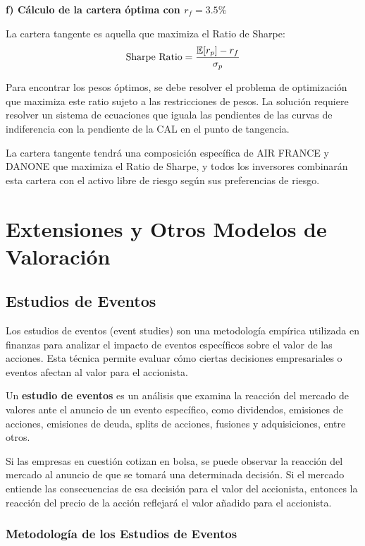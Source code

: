 \begin{ejemplo}
\textbf{f) Cálculo de la cartera óptima con $r_f = 3.5\%$}

La cartera tangente es aquella que maximiza el Ratio de Sharpe:
$$\text{Sharpe Ratio} = \frac{\mathbb{E}[r_p] - r_f}{\sigma_p}$$

Para encontrar los pesos óptimos, se debe resolver el problema de optimización que maximiza este ratio sujeto a las restricciones de pesos. La solución requiere resolver un sistema de ecuaciones que iguala las pendientes de las curvas de indiferencia con la pendiente de la CAL en el punto de tangencia.

La cartera tangente tendrá una composición específica de AIR FRANCE y DANONE que maximiza el Ratio de Sharpe, y todos los inversores combinarán esta cartera con el activo libre de riesgo según sus preferencias de riesgo.
\end{ejemplo}

\section{Extensiones y Otros Modelos de Valoración}

\subsection{Estudios de Eventos}

Los estudios de eventos (event studies) son una metodología empírica utilizada en finanzas para analizar el impacto de eventos específicos sobre el valor de las acciones. Esta técnica permite evaluar cómo ciertas decisiones empresariales o eventos afectan al valor para el accionista.

\begin{definicion}
Un \textbf{estudio de eventos} es un análisis que examina la reacción del mercado de valores ante el anuncio de un evento específico, como dividendos, emisiones de acciones, emisiones de deuda, splits de acciones, fusiones y adquisiciones, entre otros.
\end{definicion}

Si las empresas en cuestión cotizan en bolsa, se puede observar la reacción del mercado al anuncio de que se tomará una determinada decisión. Si el mercado entiende las consecuencias de esa decisión para el valor del accionista, entonces la reacción del precio de la acción reflejará el valor añadido para el accionista.

\subsubsection{Metodología de los Estudios de Eventos}

